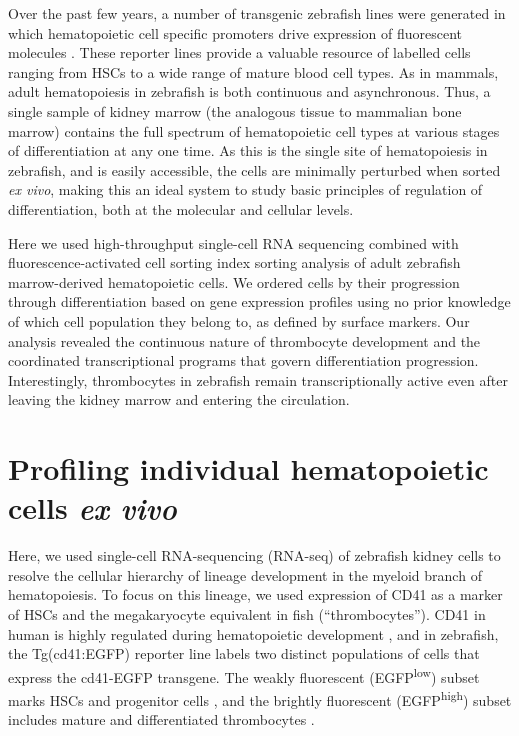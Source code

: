 Over the past few years, a number of transgenic zebrafish lines were generated in which hematopoietic cell specific promoters drive expression of fluorescent molecules \cite{Carradice2008-lz}. These reporter lines provide a valuable resource of labelled cells ranging from HSCs to a wide range of mature blood cell types. As in mammals, adult hematopoiesis in zebrafish is both continuous and asynchronous. Thus, a single sample of kidney marrow (the analogous tissue to mammalian bone marrow) contains the full spectrum of hematopoietic cell types at various stages of differentiation at any one time. As this is the single site of hematopoiesis in zebrafish, and is easily accessible, the cells are minimally perturbed when sorted \textit{ex vivo}, making this an ideal system to study basic principles of regulation of differentiation, both at the molecular and cellular levels.

Here we used high-throughput single-cell RNA sequencing combined with fluorescence-activated cell sorting index sorting analysis of adult zebrafish marrow-derived hematopoietic cells. We ordered cells by their progression through differentiation based on gene expression profiles using no prior knowledge of which cell population they belong to, as defined by surface markers. Our analysis revealed the continuous nature of thrombocyte development and the coordinated transcriptional programs that govern differentiation progression. Interestingly, thrombocytes in zebrafish remain transcriptionally active even after leaving the kidney marrow and entering the circulation.

\section{Profiling individual hematopoietic cells \textit{ex vivo}}

Here, we used single-cell RNA-sequencing (RNA-seq) of zebrafish kidney cells to resolve the cellular hierarchy of lineage development in the myeloid branch of hematopoiesis. To focus on this lineage, we used expression of CD41 as a marker of HSCs and the megakaryocyte equivalent in fish (``thrombocytes''). CD41 in human is highly regulated during hematopoietic development  \cite{Debili2001-ib, Robin2011-en}, and in zebrafish, the Tg(cd41:EGFP) reporter line labels two distinct populations of cells that express the cd41-EGFP transgene. The weakly fluorescent (EGFP\textsuperscript{low}) subset marks HSCs and progenitor cells \cite{Ma2011-hg}, and the brightly fluorescent (EGFP\textsuperscript{high}) subset includes mature and differentiated thrombocytes \cite{Ma2011-hg}.

